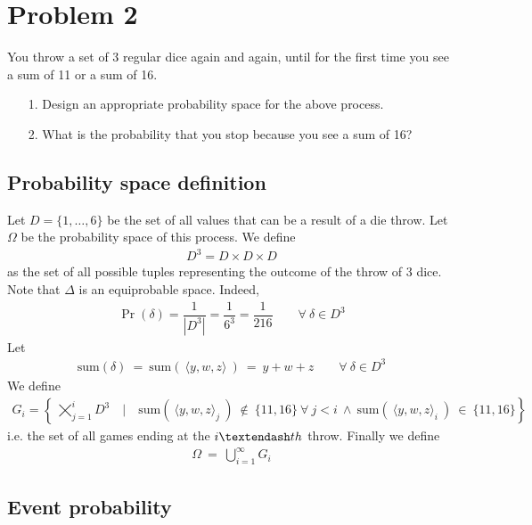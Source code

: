 
\section{Problem 2}

You throw a set of 3 regular dice again and again, until for the first time you see a
sum of 11 or a sum of 16.
\begin{itemize}
	\item[1.] Design an appropriate probability space for the above process.
	\item[2.] What is the probability that you stop because you see a sum of 16?
\end{itemize}

\subsection{Probability space definition}

Let $D = \{1, \ldots, 6\}$ be the set of all values that can be a result of a die throw. Let $\Omega$ be the probability space of this process. We define
\begin{align*}
	D^3 = D \times D \times D
\end{align*}
as the set of all possible tuples representing the outcome of the throw of 3 dice. Note that $\Delta$ is an equiprobable space. Indeed,
\begin{align*}
	\Pr(\delta) = \dfrac{1}{|D^3|} = \dfrac{1}{6^3} = \dfrac{1}{216} \qquad \forall \ \delta\in D^3
\end{align*}
Let
\begin{align*}
	\mathrm{sum}(\delta) \ = \ \mathrm{sum}(\ \langle y,w,z \rangle \ ) \ = \ y + w + z \qquad \forall \ \delta\in D^3
\end{align*}
We define
\begin{align*}
	G_i = \left \{ \ \varprod_{j = 1}^{i} D^3 \quad \big| \quad \mathrm{sum}(\ \langle y,w,z \rangle_j \ ) \ \not\in \ \{11, 16\} \ \forall \ j < i \ \wedge \ \mathrm{sum}(\ \langle y,w,z \rangle_i \ ) \ \in \ \{11, 16\} \right \}
\end{align*}
i.e. the set of all games ending at the $i \textendash th$ throw.
Finally we define
\begin{align*}
	\Omega \ = \ \bigcup_{i = 1}^{\infty} G_i
\end{align*}


\subsection{Event probability}

